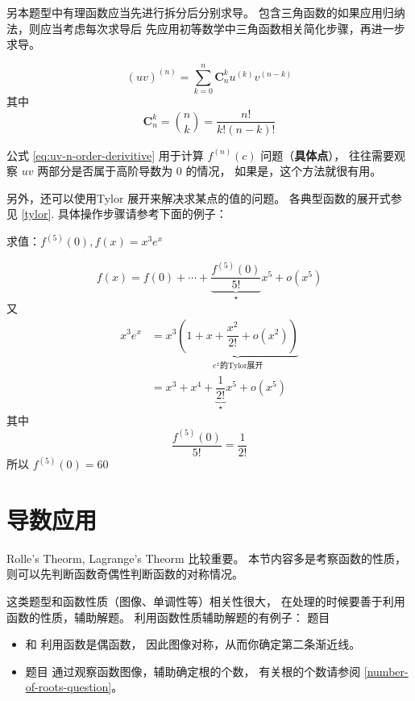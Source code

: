 另本题型中有理函数应当先进行拆分后分别求导。
包含三角函数的如果应用归纳法，则应当考虑每次求导后
先应用初等数学中三角函数相关简化步骤，再进一步求导。

\begin{lemma}
    \begin{equation}\label{eq:uv-n-order-derivitive}
        (uv)^{(n)} = \sum_{k=0}^{n} \mathbf{C}^{k}_{n} u^{(k)} v^{(n-k)}
    \end{equation}
    其中
    \begin{equation*}
        \mathbf{C}^{k}_{n} = \binom{n}{k} = \dfrac{n!}{k!(n-k)!}
    \end{equation*}
\end{lemma}

公式 \ref{eq:uv-n-order-derivitive} 用于计算 $f^{(n)}(c)$ 问题（\textbf{具体点}），
往往需要观察 $uv$ 两部分是否属于高阶导数为 0 的情况，
如果是，这个方法就很有用。

另外，还可以使用Tylor 展开来解决求某点的值的问题。
各典型函数的展开式参见 \ref{tylor}.
具体操作步骤请参考下面的例子：
\begin{example}
    求值：$f^{(5)}(0), f(x) = x^3 e^x$

    \[
        f(x) = f(0) + \cdots + \underbrace{\dfrac{f^{(5)}(0)}{5!}}_{\star} x^{5} + o(x^5)
    \]
    又
    \begin{align*}
        x^3 e^x &= x^3 \underbrace{(1+x+\dfrac{x^2}{2!} + o(x^2))}_{e^x\mbox{的Tylor展开}} \\
                &= x^3 + x^4 + \underbrace{\dfrac{1}{2!}}_{\star} x^5 + o(x^5)
    \end{align*}
    其中 
    \[
        \dfrac{f^{(5)}(0)}{5!} = \dfrac{1}{2!}
    \]
    所以 $f^{(5)}(0) = 60$
\end{example}

\section{导数应用}

Rolle's Theorm, Lagrange's Theorm 比较重要。
本节内容多是考察函数的性质，则可以先判断函数奇偶性判断函数的对称情况。

这类题型和函数性质（图像、单调性等）相关性很大，
在处理的时候要善于利用函数的性质，辅助解题。
利用函数性质辅助解题的有例子：
题目 
\begin{itemize}

    \item   \cite[page 70, pdf 81, 例1]{we} 和 
            \cite[page 75, pdf 86, 例6]{we}利用函数是偶函数，
            因此图像对称，从而你确定第二条渐近线。

    \item   题目 \cite[page 77, pdf 88, 例5, 例6]{we} 
            通过观察函数图像，辅助确定根的个数，
            有关根的个数请参阅 \ref{number-of-roots-question}。

\end{itemize}

